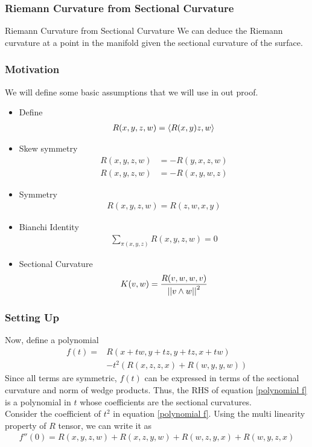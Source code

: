 \begin{frame}
\frametitle{Riemann Curvature from Sectional Curvature}
\begin{block}{Riemann Curvature from Sectional Curvature}
We can deduce the Riemann curvature at a point in the manifold given the sectional curvature of the surface.
\end{block}
\end{frame}


\begin{frame}
\frametitle{Motivation}
We will define some basic assumptions that we will use in out proof.
\begin{itemize}
\item Define 
\begin{align}
R(x,y,z,w)=\left\langle R(x,y)z,w \right\rangle
\end{align} 
\item Skew symmetry
\begin{align}
\label{skew	1}
R(x,y,z,w)&=-R(y,x,z,w)\\
\label{skew	2}
R(x,y,z,w)&=-R(x,y,w,z)
\end{align} 
\item Symmetry
\begin{align}
\label{sym}
R(x,y,z,w)=R(z,w,x,y)
\end{align}
\item Bianchi Identity
\begin{align}
\label{bianchi}
\sum_{\pi(x,y,z)}R(x,y,z,w)=0
\end{align}
\item Sectional Curvature
\begin{align}
K(v,w)=\frac{\displaystyle R(v,w,w,v)}{\displaystyle \left\lvert\left\lvert v\wedge w \right\rvert\right\rvert^2}
\end{align}
\end{itemize}
\end{frame}

\begin{frame}
\frametitle{Setting Up}
Now, define a polynomial
\begin{align}
\label{polynomial f}
f(t)=&R(x+tw,y+tz,y+tz,x+tw)\\
&-t^2(R(x,z,z,x)+R(w,y,y,w))
\end{align}
Since all terms are symmetric, $f(t)$ can be expressed in terms of the sectional curvature and norm of wedge products. Thus, the RHS of equation \ref{polynomial f} is a polynomial in $t$ whose coefficients are the sectional curvatures.\\ \pause
Consider the coefficient of $t^2$ in equation \ref{polynomial f}. Using the multi linearity property of $R$ tensor, we can write it as
\begin{align}
f''(0)=R(x,y,z,w)+R(x,z,y,w)+R(w,z,y,x)+R(w,y,z,x)
\end{align}
\end{frame}

